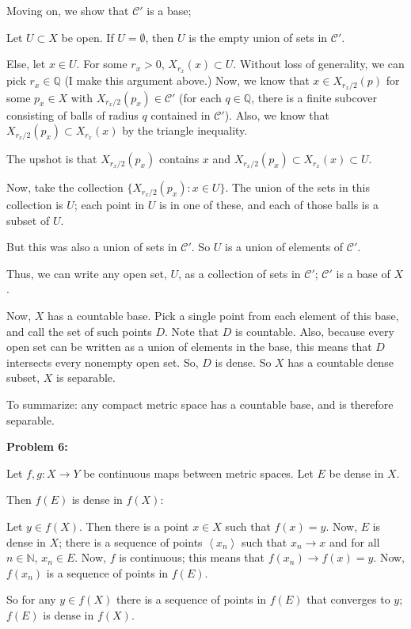 \documentclass[a4paper,12pt]{article}
\newcommand{\tab}{\hspace{4mm}} %
\newcommand{\shunt}{\vspace{20mm}}
\newcommand{\anbrack}[1]{\left\langle #1 \right\rangle}
\newcommand{\N}{\mathbb{N}}
\newcommand{\Q}{\mathbb{Q}}
\newcommand{\scrC}{\mathcal{C}}
\begin{document}
Moving on, we show that $\scrC'$ is a base;

\tab Let $U \subset X$ be open. If $U = \emptyset$, then $U$ is the empty union of sets in $\scrC'$.

\tab Else, let $x \in U$. For some $r_x>0$, $X_{r_x}(x) \subset U$. Without loss of generality, we can pick $r_x \in \Q$ (I make this argument above.) Now, we know that $x \in X_{r_x/2}(p)$ for some $p_x \in X$ with $X_{r_x/2}(p_x) \in \scrC'$ (for each $q \in \Q$, there is a finite subcover consisting of balls of radius $q$ contained in $\scrC'$). Also, we know that $X_{r_x/2}(p_x) \subset X_{r_x}(x)$ by the triangle inequality.

\tab The upshot is that $X_{r_x/2}(p_x)$ contains $x$ and $X_{r_x/2}(p_x) \subset X_{r_x}(x) \subset U$.

\tab Now, take the collection $\{X_{r_x/2}(p_x): x \in U\}$. The union of the sets in this collection is $U$; each point in $U$ is in one of these, and each of those balls is a subset of $U$.  

\tab But this was also a union of sets in $\scrC'$. So $U$ is a union of elements of $\scrC'$.

\tab Thus, we can write any open set, $U$, as a collection of sets in $\scrC'$; $\scrC'$ is a base of $X$.

Now, $X$ has a countable base. Pick a single point from each element of this base, and call the set of such points $D$. Note that $D$ is countable. Also, because every open set can be written as a union of elements in the base, this means that $D$ intersects every nonempty open set. So, $D$ is dense. So $X$ has a countable dense subset, $X$ is separable. 

To summarize: any compact metric space has a countable base, and is therefore separable.

\shunt

{\bf Problem 6:}

Let $f, g: X \to Y$ be continuous maps between metric spaces. Let $E$ be dense in $X$.

Then $f(E)$ is dense in $f(X)$:

\tab Let $y \in f(X)$. Then there is a point $x \in X$ such that $f(x) = y$. Now, $E$ is dense in $X$; there is a sequence of points $\anbrack{x_n}$ such that $x_n \to x$ and for all $n \in \N$, $x_n \in E$. Now, $f$ is continuous; this means that $f(x_n) \to f(x)=y$. Now, $f(x_n)$ is a sequence of points in $f(E)$.

\tab So for any $y \in f(X)$ there is a sequence of points in $f(E)$ that converges to $y$; $f(E)$ is dense in $f(X)$.
\end{document}
